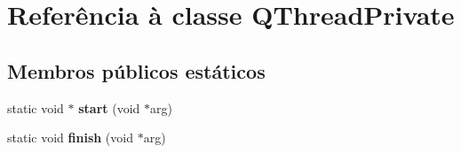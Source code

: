 \hypertarget{class_q_thread_private}{\section{Referência à classe Q\-Thread\-Private}
\label{class_q_thread_private}
}
\subsection*{Membros públicos estáticos}
\begin{DoxyCompactItemize}
\item 
\hypertarget{class_q_thread_private_a5aa258b092fa07e37681ec984da0e429}{static void $\ast$ {\bfseries start} (void $\ast$arg)}\label{class_q_thread_private_a5aa258b092fa07e37681ec984da0e429}

\item 
\hypertarget{class_q_thread_private_adf573d93bd4f849f9958f4633df82272}{static void {\bfseries finish} (void $\ast$arg)}\label{class_q_thread_private_adf573d93bd4f849f9958f4633df82272}

\end{DoxyCompactItemize}
